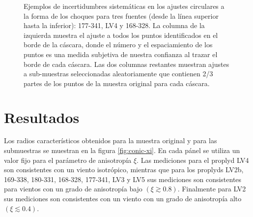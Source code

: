 \begin{figure}
\begin{tabular}{@{}c@{}c@{}c@{}}
\end{tabular}
\caption{Ejemplos de incertidumbres sistemáticas en los ajustes circulares a la forma de los choques para tres fuentes (desde la línea superior hasta la inferior): 177-341, LV4 y 168-328. La columna de la izquierda muestra el ajuste a todos los puntos identificados en el borde de la cáscara, donde el número y el espaciamiento de los puntos es una medida subjetiva de nuestra confianza al trazar el borde de cada cáscara. Las dos columnas restantes muestran ajustes a sub-muestras seleccionadas aleatoriamente que contienen 2/3 partes de los puntos de la muestra original para cada cáscara.}
\label{fig:char-radii-obs}
\end{figure}

\section{Resultados}

Los radios característicos obtenidos para la muestra original y para las submuestras se muestran en la figura \ref{fig:conic-xi}. En cada pánel se utiliza un valor fijo para el parámetro de anisotropía $\xi$. Las mediciones para el proplyd LV4 son consistentes con un viento isotrópico, mientras que para los proplyds LV2b, 169-338, 180-331, 168-328, 177-341, LV3 y LV5 sus mediciones son consistentes para vientos con un grado de anisotropía bajo $(\xi \gtrsim 0.8)$. Finalmente para LV2 sus mediciones son consistentes con un viento con un grado de anisotropía alto $(\xi \lesssim 0.4)$. 

